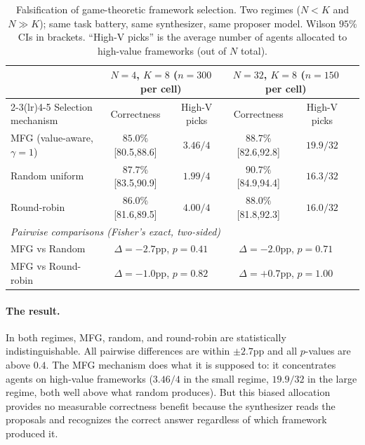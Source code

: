 \documentclass[11pt]{amsart}
\newcommand{\g}{\gamma}
\newcommand\1{{\mathds{1}}}
\theoremstyle{definition}
\theoremstyle{remark}
\numberwithin{equation}{section}
\begin{document}
\begin{table}[h]
\centering\small
\caption{Falsification of game-theoretic framework selection. Two regimes ($N\!<\!K$ and $N\!\gg\!K$); same task battery, same synthesizer, same proposer model. Wilson $95\%$ CIs in brackets. ``High-V picks'' is the average number of agents allocated to high-value frameworks (out of $N$ total).}
\label{tab:falsification}
\begin{tabular}{lccccc}
\toprule
& \multicolumn{2}{c}{$N\!=\!4$, $K\!=\!8$ ($n\!=\!300$ per cell)} & \multicolumn{2}{c}{$N\!=\!32$, $K\!=\!8$ ($n\!=\!150$ per cell)} \\
\cmidrule(lr){2-3}\cmidrule(lr){4-5}
Selection mechanism & Correctness & High-V picks & Correctness & High-V picks \\
\midrule
MFG (value-aware, $\g\!=\!1$) & $85.0\%$ {\scriptsize[80.5,88.6]} & $3.46/4$ & $88.7\%$ {\scriptsize[82.6,92.8]} & $19.9/32$ \\
Random uniform                  & $87.7\%$ {\scriptsize[83.5,90.9]} & $1.99/4$ & $90.7\%$ {\scriptsize[84.9,94.4]} & $16.3/32$ \\
Round-robin                     & $86.0\%$ {\scriptsize[81.6,89.5]} & $4.00/4$ & $88.0\%$ {\scriptsize[81.8,92.3]} & $16.0/32$ \\
\midrule
\multicolumn{5}{l}{\emph{Pairwise comparisons (Fisher's exact, two-sided)}} \\
MFG vs Random      & \multicolumn{2}{c}{$\Delta\!=\!{-2.7}$pp, $p\!=\!0.41$} & \multicolumn{2}{c}{$\Delta\!=\!{-2.0}$pp, $p\!=\!0.71$} \\
MFG vs Round-robin & \multicolumn{2}{c}{$\Delta\!=\!{-1.0}$pp, $p\!=\!0.82$} & \multicolumn{2}{c}{$\Delta\!=\!{+0.7}$pp, $p\!=\!1.00$} \\
\bottomrule
\end{tabular}
\end{table}

\paragraph{The result.}
In both regimes, MFG, random, and round-robin are statistically indistinguishable.
All pairwise differences are within $\pm 2.7$pp and all $p$-values are above $0.4$.
The MFG mechanism does what it is supposed to: it concentrates agents on high-value frameworks ($3.46/4$ in the small regime, $19.9/32$ in the large regime, both well above what random produces).
But this biased allocation provides no measurable correctness benefit because the synthesizer reads the proposals and recognizes the correct answer regardless of which framework produced it.
\end{document}
